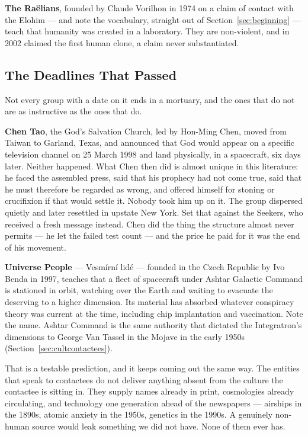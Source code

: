 \textbf{The Ra\"elians}, founded by Claude Vorilhon in 1974 on a claim of contact with the
Elohim --- and note the vocabulary, straight out of Section~\ref{sec:beginning} --- teach that humanity was
created in a laboratory. They are non-violent, and in 2002 claimed the first human clone, a
claim never substantiated.

\subsection{The Deadlines That Passed}\label{sec:cultdeadlines}

Not every group with a date on it ends in a mortuary, and the ones that do not are as instructive
as the ones that do.

\textbf{Chen Tao}, the God's Salvation Church, led by Hon-Ming Chen, moved from Taiwan to Garland,
Texas, and announced that God would appear on a specific television channel on 25 March 1998 and
land physically, in a spacecraft, six days later. Neither happened. What Chen then did is almost
unique in this literature: he faced the assembled press, said that his prophecy had not come true,
said that he must therefore be regarded as wrong, and offered himself for stoning or crucifixion
if that would settle it. Nobody took him up on it. The group dispersed quietly and later resettled
in upstate New York. Set that against the Seekers, who received a fresh message instead. Chen did
the thing the structure almost never permits --- he let the failed test count --- and the price he
paid for it was the end of his movement.

\textbf{Universe People} --- Vesm\'irn\'i lid\'e --- founded in the Czech Republic by Ivo Benda in
1997, teaches that a fleet of spacecraft under Ashtar Galactic Command is stationed in orbit,
watching over the Earth and waiting to evacuate the deserving to a higher dimension. Its material
has absorbed whatever conspiracy theory was current at the time, including chip implantation and
vaccination. Note the name. Ashtar Command is the same authority that dictated the Integratron's
dimensions to George Van Tassel in the Mojave in the early 1950s (Section~\ref{sec:cultcontactees}).


That is a testable prediction, and it keeps coming out the same way. The entities that speak to
contactees do not deliver anything absent from the culture the contactee is sitting in. They
supply names already in print, cosmologies already circulating, and technology one generation
ahead of the newspapers --- airships in the 1890s, atomic anxiety in the 1950s, genetics in the
1990s. A genuinely non-human source would leak something we did not have. None of them ever has.

